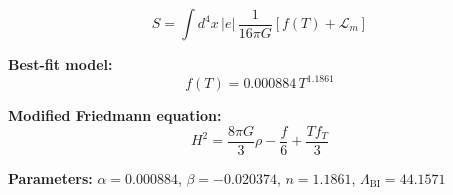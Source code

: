 
\begin{equation}
  S = \int d^4x \, |e| \, \frac{1}{16\pi G} \left[ f(T) + \mathcal{L}_m \right]
\end{equation}

\textbf{Best-fit model:}
\begin{equation}
  f(T) = 0.000884 \, T^{1.1861}
\end{equation}

\textbf{Modified Friedmann equation:}
\begin{equation}
  H^2 = \frac{8\pi G}{3} \rho - \frac{f}{6} + \frac{T f_T}{3}
\end{equation}

\textbf{Parameters:}
$\alpha = 0.000884$, \quad
$\beta = -0.020374$, \quad
$n = 1.1861$, \quad
$\Lambda_{\text{BI}} = 44.1571$